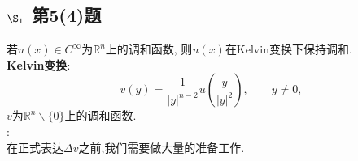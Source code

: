 \documentclass[12pt, a4paper]{ctexbook}
\begin{document}
\begin{itemize}
\begin{enumerate}
            
        \end{enumerate}
        
    \end{itemize}
    \subsection{$\S_{1.1}$第5(4)题}
    \kaishu{}
    若$u(x)\in C^\infty$为$\mathbb{R}^n$上的调和函数, 则$u(x)$在Kelvin变换下保持调和.\\
    {\bf Kelvin变换}:$$v(y) = \frac1{|y|^{n-2}}u\left(\frac{y}{|y|^2}\right),\qquad y\neq0,$$ $v$为$\mathbb{R}^n \backslash\{0\}$上的调和函数.\\
    
    
    \songti{}
    :\\
    
    在正式表达$\Delta v$之前,我们需要做大量的准备工作.
    
\end{document}
